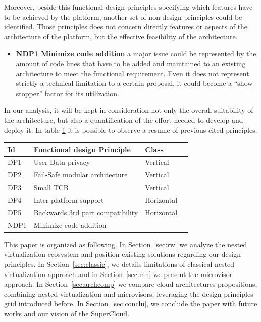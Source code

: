 \documentclass{sig-alternate}
\begin{document}
Moreover, beside this functional design principles specifying which features have to be achieved by the platform, another set of non-design principles could be identified. Those principles does not concern directly features or aspects of the architecture of the platform, but the effective feasibility of the architecture. 
\begin{itemize}[]
\item \textbf{NDP1 Minimize code addition} a major issue could be represented by the amount of code lines that have to be added and maintained to an existing architecture to meet the functional requirement. Even it does not represent strictly a technical limitation to a certain proposal, it could become a ``show-stopper'' factor for its utilization.
\end{itemize}
In our analysis, it will be kept in consideration not only the overall suitability of the architecture, but also a quantification of the effort needed to develop and deploy it. In table \ref{int:des} it is possible to observe a resume of previous cited principles.
 
\begin{table}
\label{int:des}
\begin{tabular}{llll}
\toprule
Id & Functional design Principle & Class &\\
\midrule
   DP1 & User-Data privacy & Vertical & \\
   DP2 & Fail-Safe modular architecture & Vertical & \\ 
   DP3 & Small TCB & Vertical & \\
   DP4 & Inter-platform support & Horizontal & \\
   DP5 & Backwards 3rd part compatibility & Horizontal \\
   NDP1 & Minimize code addition & & \\
\bottomrule
\end{tabular}
\end{table}

This paper is organized as following. In Section~\ref{sec:rw} we analyze the nested virtualization ecosystem and position existing solutions regarding our design principles. In Section~\ref{sec:classic}, we details limitations of classical nested virtualization approach and in Section~\ref{sec:mh} we present the microvisor approach. In Section~\ref{sec:archcomp} we compare cloud architectures propositions, combining nested virtualization and microvisors, leveraging the design principles grid introduced before.
In Section~\ref{sec:conclu}, we conclude the paper with future works and our vision of the SuperCloud.
 
\end{document}
